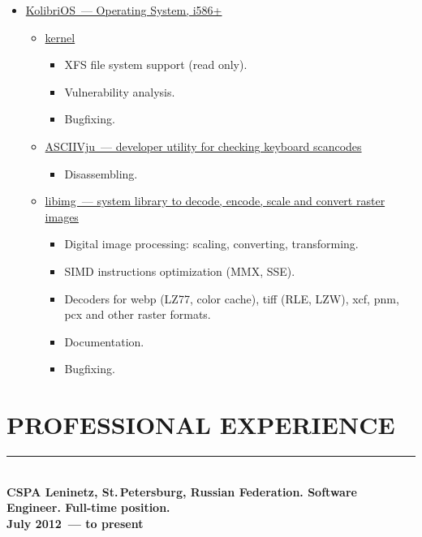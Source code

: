\documentclass[a4paper,oneside,12pt]{article}
\newcommand{\cvpart}[1]{%
\vspace{-0.9em}%
\section*{\Large\bfseries\MakeTextUppercase{#1}}%
\vspace{-1.7em}%
\rule{\linewidth}{0.3em}\\[-0.8em]%
}
\begin{document}
\begin{itemize}
\item \href{http://websvn.kolibrios.org/listing.php?repname=Kolibri+OS}{KolibriOS~--- Operating System, i586+}
\begin{itemize}
\item \href{http://websvn.kolibrios.org/listing.php?repname=Kolibri+OS&path=%2Fkernel%2Ftrunk%2Ffs%2F&#a0aa5cede7308db82d4bae78266ed8462}{kernel}
\begin{itemize}
\item XFS file system support (read only).
\item Vulnerability analysis.
\item Bugfixing.
\end{itemize}
\item \href{http://websvn.kolibrios.org/listing.php?repname=Kolibri+OS&path=%2Fprograms%2Fdevelop%2Fasciivju%2Ftrunk%2F&#a5da69869b5757c5b71158a900f51c0c3}{ASCIIVju~--- developer utility for checking keyboard scancodes}
\begin{itemize}
\item Disassembling.
\end{itemize}
\item \href{http://websvn.kolibrios.org/listing.php?repname=Kolibri+OS&path=%2Fprograms%2Fdevelop%2Flibraries%2Flibs-dev%2Flibimg%2F&#ac73184f3b97abb1a3031cce2f0fae471}{libimg~--- system library to decode, encode, scale and convert raster images}
\begin{itemize}
\item Digital image processing: scaling, converting, transforming.
\item SIMD instructions optimization (MMX, SSE).
\item Decoders for webp (LZ77, color cache), tiff (RLE, LZW), xcf, pnm, pcx and other raster formats.
\item Documentation.
\item Bugfixing.
\end{itemize}
\end{itemize}
\end{itemize}


\cvpart{Professional Experience}

{\bf
CSPA Leninetz, St.\,Petersburg, Russian Federation. Software Engineer. Full-time position.\\
July 2012~--- to present
}
\end{document}
